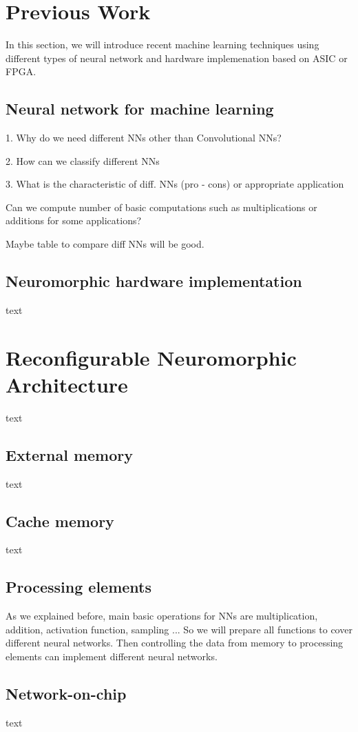 \documentclass[pageno]{jpaper}
\begin{document}
\section{Previous Work}
In this section, we will introduce recent machine learning techniques using different types of neural network and hardware implemenation based on ASIC or FPGA. 

\subsection{Neural network for machine learning} 
1. Why do we need different NNs other than Convolutional NNs?

2. How can we classify different NNs

3. What is the characteristic of diff. NNs (pro - cons) or appropriate application

Can we compute number of basic computations such as multiplications or additions for some applications? 

Maybe table to compare diff NNs will be good.
\subsection{Neuromorphic hardware implementation}
text


\section{Reconfigurable Neuromorphic Architecture}
text
\subsection{External memory}
text
\subsection{Cache memory}
text
\subsection{Processing elements}
As we explained before, main basic operations for NNs are multiplication, addition, activation function, sampling ... So we will prepare all functions to cover different neural networks. Then controlling the data from memory to processing elements can implement different neural networks.
\subsection{Network-on-chip}
text
\end{document}
